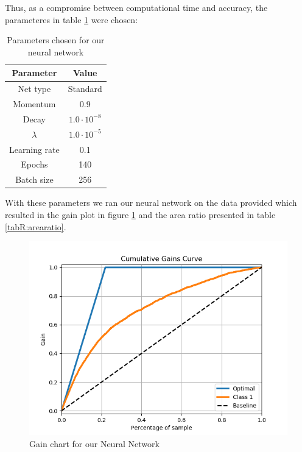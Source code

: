 \documentclass[12pt]{article}
\numberwithin{figure}{section}
\begin{document}
Thus, as a compromise between computational time and accuracy, the parameteres in table \ref{tabR:parameters} were chosen:
\begin{table}[H]
\centering
\begin{tabular}{c|c}
Parameter & Value \\ \hline
Net type & Standard \\
Momentum & 0.9 \\
Decay & $1.0 \cdot 10^{-8}$ \\
$\lambda$ & $1.0 \cdot 10^{-5}$ \\
Learning rate & 0.1 \\
Epochs & 140 \\
Batch size & 256 \\ \hline
\end{tabular}
\caption{Parameters chosen for our neural network}
\label{tabR:parameters}
\end{table}
With these parameters we ran our neural network on the data provided which resulted in the gain plot in figure \ref{figR:nngain} and the area ratio presented in table \ref{tabR:arearatio}.
\begin{figure}[H]
\centering
\includegraphics[scale=0.8]{../figures/gain-NN.png}
\caption{Gain chart for our Neural Network}
\label{figR:nngain}
\end{figure}
\end{document}
